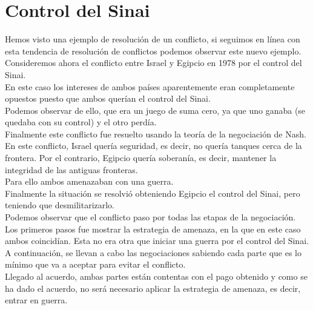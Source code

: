 \documentclass[10pt,a4paper]{book}
\begin{document}
\section{Control del Sinai}

Hemos visto una ejemplo de resolución de un conflicto, si seguimos en línea con esta tendencia de resolución de conflictos podemos observar este nuevo ejemplo.\\

Consideremos ahora el conflicto entre Israel y Egipcio en 1978 por el control del Sinai.\\

En este caso los intereses de ambos países aparentemente eran completamente opuestos puesto que ambos querían el control del Sinai. \\

Podemos observar de ello, que era un juego de suma cero, ya que uno ganaba (se quedaba con su control) y el otro perdía.\\

Finalmente este conflicto fue resuelto usando la teoría de la negociación de Nash.\\

En este conflicto, Israel quería seguridad, es decir, no quería tanques cerca de la frontera. Por el contrario, Egipcio quería soberanía, es decir, mantener la integridad de las antiguas fronteras.\\

Para ello ambos amenazaban con una guerra.\\

Finalmente la situación se resolvió obteniendo Egipcio el control del Sinai, pero teniendo que desmilitarizarlo.\\

Podemos observar que el conflicto paso por todas las etapas de la negociación. \\
Los primeros pasos fue mostrar la estrategia de amenaza, en la que en este caso ambos coincidían. Esta no era otra que iniciar una guerra por el control del Sinai.\\

A continuación, se llevan a cabo las negociaciones sabiendo cada parte que es lo mínimo que va a aceptar para evitar el conflicto.\\

Llegado al acuerdo, ambas partes están contentas con el pago obtenido y como se ha dado el acuerdo, no será necesario aplicar la estrategia de amenaza, es decir, entrar en guerra.\\
\end{document}
